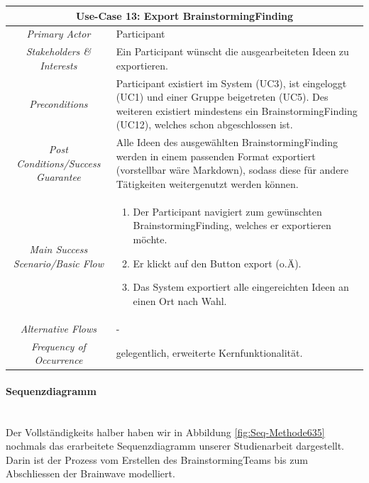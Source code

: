 \renewcommand{\arraystretch}{1.35}
\begin{center}
	\begin{longtable}{| c | p{7cm} |}
		\hline
		\multicolumn{2}{|c|}{\textbf{Use-Case 13: Export BrainstormingFinding}}\\
		\hline\hline
		\textit{Primary Actor} & Participant\\
		\hline
		\textit{Stakeholders \& Interests} & Ein Participant wünscht die ausgearbeiteten Ideen zu exportieren. \\
		\hline
		\textit{Preconditions} & Participant existiert im System (UC3), ist eingeloggt (UC1) und einer Gruppe beigetreten (UC5). Des weiteren existiert mindestens ein BrainstormingFinding (UC12), welches schon abgeschlossen ist.\\
		\hline
		\textit{Post Conditions/Success Guarantee} & Alle Ideen des ausgewählten BrainstormingFinding werden in einem passenden Format exportiert (vorstellbar wäre Markdown), sodass diese für andere Tätigkeiten weitergenutzt werden können.\\
		\hline
		\textit{Main Success Scenario/Basic Flow} & 
		\begin{enumerate}[noitemsep]
			\item Der Participant navigiert zum gewünschten BrainstormingFinding, welches er exportieren möchte.
			\item Er klickt auf den Button export (o.Ä).
			\item Das System exportiert alle eingereichten Ideen an einen Ort nach Wahl.
		\end{enumerate}\\
		\hline
		\textit{Alternative Flows} &
		-\\
		\hline
		\textit{Frequency of Occurrence} & gelegentlich, erweiterte Kernfunktionalität.\\
		\hline
	\end{longtable}
\end{center}

\paragraph{Sequenzdiagramm}~\\
Der Vollständigkeits halber haben wir in Abbildung \ref{fig:Seq-Methode635} nochmals das erarbeitete Sequenzdiagramm unserer Studienarbeit \cite{methode635-sa} dargestellt. Darin ist der Prozess vom Erstellen des BrainstormingTeams bis zum Abschliessen der Brainwave modelliert. 

